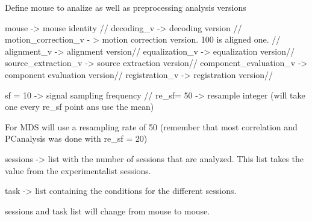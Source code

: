 \documentclass[11pt]{article}
\begin{document}
    Define mouse to analize as well as preprocessing analysis versions

mouse -\textgreater{} mouse identity // decoding\_v -\textgreater{}
decoding version // motion\_correction\_v - \textgreater{} motion
correction version. 100 is aligned one. // alignment\_v -\textgreater{}
alignment version// equalization\_v -\textgreater{} equalization
version// source\_extraction\_v -\textgreater{} source extraction
version// component\_evaluation\_v -\textgreater{} component evaluation
version// registration\_v -\textgreater{} registration version//

sf = 10 -\textgreater{} signal sampling frequency // re\_sf= 50
-\textgreater{} resample integer (will take one every re\_sf point ans
use the mean)

For MDS will use a resampling rate of 50 (remember that most correlation
and PCanalysis was done with re\_sf = 20)

sessions -\textgreater{} list with the number of sessions that are
analyzed. This list takes the value from the experimentalist sessions.

task -\textgreater{} list containing the conditions for the different
sessions.

sessions and task list will change from mouse to mouse.
\end{document}
